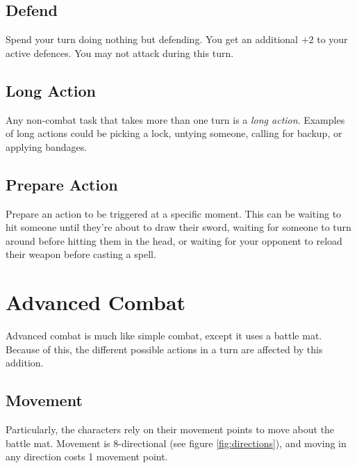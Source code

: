 \subsection{Defend}
Spend your turn doing nothing but defending. 
You get an additional $+2$ to your active defences. 
You may not attack during this turn.

\subsection{Long Action}
Any non-combat task that takes more than one turn is a \textit{long action}.
Examples of long actions could be picking a lock, untying someone, calling for backup, or applying bandages.

\subsection{Prepare Action}
Prepare an action to be triggered at a specific moment.
This can be waiting to hit someone until they're about to draw their sword, waiting for someone to turn around before hitting them in the head, or waiting for your opponent to reload their weapon before casting a spell.

\newpage
\section{Advanced Combat}
Advanced combat is much like simple combat, except it uses a battle mat. Because of this, the different possible actions in a turn are affected by this addition.

\subsection{Movement}
Particularly, the characters rely on their movement points to move about the battle mat.
Movement is 8-directional (see figure \ref{fig:directions}), and moving in any direction costs 1 movement point.

